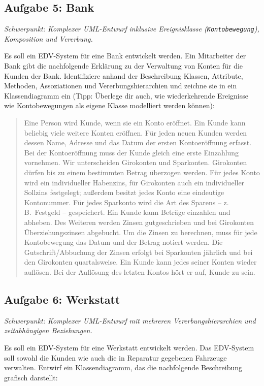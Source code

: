 \subsection{Aufgabe 5: Bank \tagZusatz \tagLK}
\noindent \emph{Schwerpunkt: Komplexer UML-Entwurf inklusive Ereignisklasse (\texttt{Kontobewegung}), Komposition und Vererbung.}

Es soll ein EDV-System für eine Bank entwickelt werden. Ein Mitarbeiter der Bank
gibt die nachfolgende Erklärung zu der Verwaltung von Konten für die Kunden der
Bank. Identifiziere anhand der Beschreibung Klassen, Attribute, Methoden,
Assoziationen und Vererbungshierarchien und zeichne sie in ein Klassendiagramm
ein (Tipp: Überlege dir auch, wie wiederkehrende Ereignisse wie Kontobewegungen 
als eigene Klasse modelliert werden können):

\begin{quotation}
\noindent Eine Person wird Kunde, wenn sie ein Konto eröffnet. Ein Kunde kann
beliebig viele weitere Konten eröffnen. Für jeden neuen Kunden werden dessen
Name, Adresse und das Datum der ersten Kontoeröffnung erfasst. Bei der
Kontoeröffnung muss der Kunde gleich eine erste Einzahlung vornehmen.
Wir unterscheiden Girokonten und Sparkonten. Girokonten dürfen bis zu einem
bestimmten Betrag überzogen werden. Für jedes Konto wird ein individueller
Habenzins, für Girokonten auch ein individueller Sollzins festgelegt; außerdem
besitzt jedes Konto eine eindeutige Kontonummer. Für jedes Sparkonto wird die
Art des Sparens -- z.\,B.\ Festgeld -- gespeichert. Ein Kunde kann Beträge einzahlen
und abheben. Des Weiteren werden Zinsen gutgeschrieben und bei Girokonten
Überziehungszinsen abgebucht. Um die Zinsen zu berechnen, muss für jede
Kontobewegung das Datum und der Betrag notiert werden. Die Gutschrift/Abbuchung
der Zinsen erfolgt bei Sparkonten jährlich und bei den Girokonten
quartalsweise. Ein Kunde kann jedes seiner Konten wieder auflösen. Bei der
Auflösung des letzten Kontos hört er auf, Kunde zu sein.
\end{quotation}


\subsection{Aufgabe 6: Werkstatt \tagZusatz \tagLK}
\noindent \emph{Schwerpunkt: Komplexer UML-Entwurf mit mehreren Vererbungshierarchien und zeitabhängigen Beziehungen.}

Es soll ein EDV-System für eine Werkstatt entwickelt werden. Das EDV-System
soll sowohl die Kunden wie auch die in Reparatur gegebenen Fahrzeuge verwalten.
Entwirf ein Klassendiagramm, das die nachfolgende Beschreibung grafisch
darstellt:

